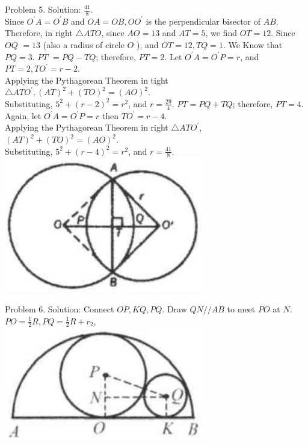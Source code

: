 \documentclass[10pt]{article}
\begin{document}
Problem 5. Solution: \(\frac{41}{8}\).\\
Since \(O^{\prime} A=O^{\prime} B\) and \(O A=O B, O O^{\prime}\) is the perpendicular bisector of \(A B\).\\
Therefore, in right \(\triangle A T O\), since \(A O=13\) and \(A T=5\), we find \(O T=12\). Since \(O Q\) \(=13\) (also a radius of circle \(O\) ), and \(O T=12, T Q=1\). We Know that \(P Q=3\). \(P T\) \(=P Q-T Q\); therefore, \(P T=2\). Let \(O^{\prime} A=O^{\prime} P=r\), and \(P T=2, T O^{\prime}=r-2\).\\
Applying the Pythagorean Theorem in tight \(\triangle A T O^{\prime},(A T)^{2}+(T O)^{2}=(A O)^{2}\).\\
Substituting, \(5^{2}+(r-2)^{2}=r^{2}\), and \(r=\frac{29}{4}\). \(P T=P Q+T Q\); therefore, \(P T=4\).\\
Again, let \(O^{\prime} A=O^{\prime} P=r\) then \(T O^{\prime}=r-4\).\\
Applying the Pythagorean Theorem in right \(\triangle A T O^{\prime}\),\\
\((A T)^{2}+(T O)^{2}=(A O)^{2}\).\\
Substituting, \(5^{2}+(r-4)^{2}=r^{2}\), and \(r=\frac{41}{8}\).\\
\includegraphics[max width=\textwidth, center]{2025_04_17_97bc1f7e44d93c271a88g-188(2)}

Problem 6. Solution:
Connect \(O P, K Q, P Q\). Draw \(Q N / / A B\) to meet \(P O\) at \(N\).\\
\(P O=\frac{1}{2} R, P Q=\frac{1}{2} R+r_{2}\),\\
\includegraphics[max width=\textwidth, center]{2025_04_17_97bc1f7e44d93c271a88g-188}
\end{document}
